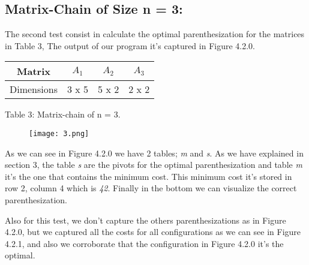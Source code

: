 \subsection{Matrix-Chain of Size n = 3:}

The second test consist in calculate the optimal parenthesization for the matrices in Table 3, The output of our program it's captured in Figure 4.2.0. \hfill \break

\begin{center}
\begin{tabular}{c c c c}
\toprule
\toprule
\hspace{20px} Matrix \hspace{20px} & \hspace{50px} $A_{1}$ \hspace{50px} & \hspace{50px} $A_{2}$ \hspace{50px} & \hspace{50px} $A_{3}$ \hspace{50px} \\
\toprule
\toprule
Dimensions & 3 x 5 & 5 x 2 & 2 x 2 \\
\bottomrule
\end{tabular}
\linebreak \linebreak Table 3: Matrix-chain of n = 3.
\end{center} \hfill

\begin{figure}[H]
\texttt{[image: 3.png]}
\centering \linebreak {}
\end{figure} \hfill

As we can see in Figure 4.2.0 we have 2 tables; {\itshape m} and {\itshape s}. As we have explained in section 3, the table {\itshape s} are the pivots for the optimal parenthesization and table {\itshape m} it's the one that contains the minimum cost. This minimum cost it's stored in row 2, column 4 which is {\itshape 42}. Finally in the bottom we can visualize the correct parenthesization. 

\pagebreak

Also for this test, we don't capture the others parenthesizations as in Figure 4.2.0, but we captured all the costs for all configurations as we can see in Figure 4.2.1, and also we corroborate that the configuration in Figure 4.2.0 it's the optimal. \hfill \break

